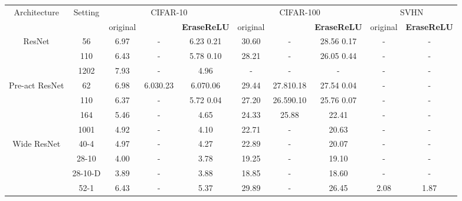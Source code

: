 \documentclass[10pt,twocolumn,letterpaper]{article}
\begin{document}
\begin{table*}[t]
\setlength{\tabcolsep}{2pt}
\begin{center}
\begin{tabular}{|c|c|c|c|c|c|c|c|c|c|}
\hline
\multirow{2}{*}{Architecture}& \multirow{2}{*}{Setting} & \multicolumn{3}{c|}{CIFAR-10}             & \multicolumn{3}{c|}{CIFAR-100} & \multicolumn{2}{c|}{SVHN}     \\ 
                                &        & original     &\cite{zhao2017training}& \bf{EraseReLU} &  original & \cite{zhao2017training} &  \bf{EraseReLU} &  original & \bf{EraseReLU}\\ \hline
\multirow{3}{*}{ResNet\cite{he2016deep}}
								&56      &     6.97     &  -          &  6.23  0.21 & 30.60&  -        &28.56 0.17 &  -        &  -   \\
						        &110     &     6.43     &  -          &  5.78  0.10 & 28.21&  -        &26.05 0.44 &  -        &  -   \\
                                &1202    &     7.93     &  -          &  4.96            &       -       &  -        &    -           &  -        &  -   \\ \hline
\multirow{3}{*}{Pre-act ResNet\cite{he2016identity}}
								&62      &6.98 &6.030.23&6.070.06&  29.44 &27.810.18& 27.54  0.04        &  -        &  -   \\
								&110     &     6.37     &  -          &  5.72  0.04 &     27.20     &26.590.10&25.76 0.07 &  -        &  -   \\
						        &164     &     5.46     &  -          &  4.65            &     24.33     &25.88      &   22.41       &  -        &  -   \\
                                &1001    &     4.92     &  -          &  4.10            &     22.71     & -         &    20.63       &  -        &  -   \\\hline
\multirow{8}{*}{Wide ResNet\cite{zagoruyko2016wide}}
								&40-4    &     4.97     &  -          &  4.27            &     22.89     &  -        &   20.07       &  -        &  -   \\
                                &28-10   &     4.00     &  -          &  3.78            &     19.25     &  -        &   19.10       &  -        &  -   \\
                                &28-10-D &     3.89     &  -          &  3.88            &     18.85     &  -        &   18.60       &  -        &  -   \\
                                &52-1    &     6.43     &  -          &  5.37            &     29.89     &  -        &   26.45       & 2.08      & 1.87 \\

\end{tabular}
\end{center}
\end{table*}
\end{document}
